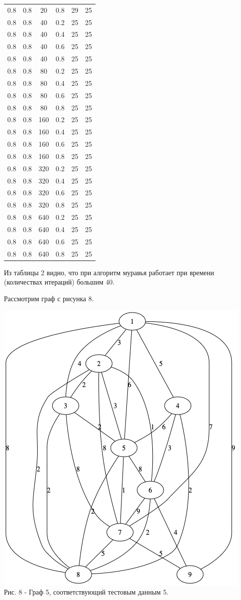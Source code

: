 \documentclass[a4paper,14pt]{article} %
\begin{document}
\begin{table}[H]
\begin{tabular}{|c|c|c|c|c|c|}
0.8&0.8&20&0.8&29&25\\
0.8&0.8&40&0.2&25&25\\
0.8&0.8&40&0.4&25&25\\
0.8&0.8&40&0.6&25&25\\
0.8&0.8&40&0.8&25&25\\
0.8&0.8&80&0.2&25&25\\
0.8&0.8&80&0.4&25&25\\
0.8&0.8&80&0.6&25&25\\
0.8&0.8&80&0.8&25&25\\
0.8&0.8&160&0.2&25&25\\
0.8&0.8&160&0.4&25&25\\
0.8&0.8&160&0.6&25&25\\
0.8&0.8&160&0.8&25&25\\
0.8&0.8&320&0.2&25&25\\
0.8&0.8&320&0.4&25&25\\
0.8&0.8&320&0.6&25&25\\
0.8&0.8&320&0.8&25&25\\
0.8&0.8&640&0.2&25&25\\
0.8&0.8&640&0.4&25&25\\
0.8&0.8&640&0.6&25&25\\
0.8&0.8&640&0.8&25&25\\
\hline
\end{tabular}
\end{table}
Из таблицы 2 видно, что при алгоритм муравья работает при времени (количествах итераций) большим 40. 
	
	
	Рассмотрим граф с рисунка 8. 
	
	\begin{center}
		\includegraphics[scale = 0.8]{graph5} \\ Рис.  8 - Граф 5, соответствующий тестовым данным 5.  
	\end{center}
	
\end{document}
